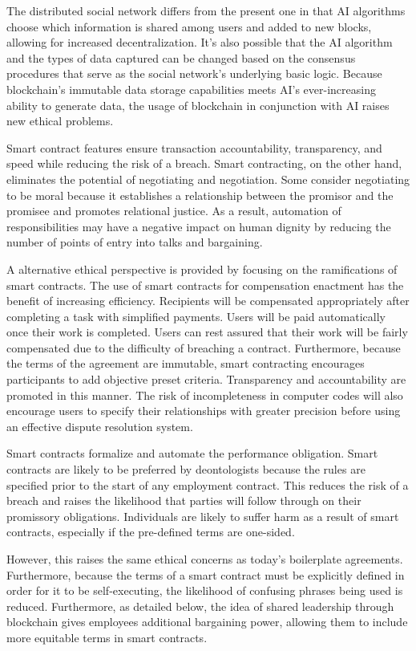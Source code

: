 \documentclass[10pt,twocolumn]{article}
\begin{document}
\begin{Ethics}
The distributed social network differs from the present one in that AI algorithms choose which information is shared among users and added to new blocks, allowing for increased decentralization. It's also possible that the AI algorithm and the types of data captured can be changed based on the consensus procedures that serve as the social network's underlying basic logic. Because blockchain's immutable data storage capabilities meets AI's ever-increasing ability to generate data, the usage of blockchain in conjunction with AI raises new ethical problems.

Smart contract features ensure transaction accountability, transparency, and speed while reducing the risk of a breach. Smart contracting, on the other hand, eliminates the potential of negotiating and negotiation\cite{YTangEthics}. Some consider negotiating to be moral because it establishes a relationship between the promisor and the promisee and promotes relational justice. As a result, automation of responsibilities may have a negative impact on human dignity by reducing the number of points of entry into talks and bargaining.

A alternative ethical perspective is provided by focusing on the ramifications of smart contracts. The use of smart contracts for compensation enactment has the benefit of increasing efficiency. Recipients will be compensated appropriately after completing a task with simplified payments. Users will be paid automatically once their work is completed. Users can rest assured that their work will be fairly compensated due to the difficulty of breaching a contract. Furthermore, because the terms of the agreement are immutable, smart contracting encourages participants to add objective preset criteria. Transparency and accountability are promoted in this manner. The risk of incompleteness in computer codes will also encourage users to specify their relationships with greater precision before using an effective dispute resolution system.

Smart contracts formalize and automate the performance obligation. Smart contracts are likely to be preferred by deontologists because the rules are specified prior to the start of any employment contract. This reduces the risk of a breach and raises the likelihood that parties will follow through on their promissory obligations. Individuals are likely to suffer harm as a result of smart contracts, especially if the pre-defined terms are one-sided.

However, this raises the same ethical concerns as today's boilerplate agreements. Furthermore, because the terms of a smart contract must be explicitly defined in order for it to be self-executing, the likelihood of confusing phrases being used is reduced. Furthermore, as detailed below, the idea of shared leadership through blockchain gives employees additional bargaining power, allowing them to include more equitable terms in smart contracts.


\end{Ethics}
\end{document}
